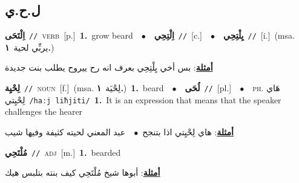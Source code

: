 \documentclass[10pt,a4paper,twoside]{article} %
\begin{document}
\begin{multicols}{2}
\vspace{-3mm}
\subsection*{\color{blue}\foreignlanguage{arabic}{ل.ح.ي}\color{blue}{}} 

{\setlength\topsep{0pt}\textbf{\foreignlanguage{arabic}{اِلْتَحَى}}\ {\color{gray}\texttt{//}\color{black}}\ \textsc{verb}\ [p.]\ \textbf{1.}~grow beard\ \ $\bullet$\ \ \setlength\topsep{0pt}\textbf{\foreignlanguage{arabic}{اِلْتِحِي}}\ {\color{gray}\texttt{//}\color{black}}\ [c.]\ \ $\bullet$\ \ \setlength\topsep{0pt}\textbf{\foreignlanguage{arabic}{يِلْتِحِي}}\ {\color{gray}\texttt{//}\color{black}}\ [i.]\ \color{gray}(msa. \foreignlanguage{arabic}{يربِّي لحية}~\foreignlanguage{arabic}{\textbf{١.}})\color{black}\  \begin{flushright}\color{gray}\foreignlanguage{arabic}{\textbf{\underline{\foreignlanguage{arabic}{أمثلة}}}: بس أخي يِلْتِحِي بعرف انه رح ييروح يطلب بنت جديدة}\end{flushright}\color{black}} \vspace{2mm}

{\setlength\topsep{0pt}\textbf{\foreignlanguage{arabic}{لِحْيِة}}\ {\color{gray}\texttt{//}\color{black}}\ \textsc{noun}\ [f.]\ \color{gray}(msa. \foreignlanguage{arabic}{لِحْيَة}~\foreignlanguage{arabic}{\textbf{١.}})\color{black}\ \textbf{1.}~beard\ \ $\bullet$\ \ \setlength\topsep{0pt}\textbf{\foreignlanguage{arabic}{لُحَى}}\ {\color{gray}\texttt{//}\color{black}}\ [pl.]\ \ $\bullet$\ \ \textsc{ph.} \color{gray} \foreignlanguage{arabic}{هَاي لِحْيِتي}\color{black}\ {\color{gray}\texttt{/{\sffamily haːj liħjiti}/}\color{black}}\ \textbf{1.}~It is an expression that means that the speaker challenges the hearer\  \begin{flushright}\color{gray}\foreignlanguage{arabic}{\textbf{\underline{\foreignlanguage{arabic}{أمثلة}}}: هاي لِحْيِتي اذا بتنجح\ $\bullet$\ \  عبد المعني لحيته كثيفة وفيها شيب}\end{flushright}\color{black}} \vspace{2mm}

{\setlength\topsep{0pt}\textbf{\foreignlanguage{arabic}{مُلْتَحِي}}\ {\color{gray}\texttt{//}\color{black}}\ \textsc{adj}\ [m.]\ \textbf{1.}~bearded\  \begin{flushright}\color{gray}\foreignlanguage{arabic}{\textbf{\underline{\foreignlanguage{arabic}{أمثلة}}}: أبوها شيخ مُلْتَحِي كيف بنته بتلبس هيك}\end{flushright}\color{black}} \vspace{2mm}


\end{multicols}
\end{document}
